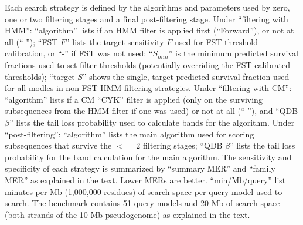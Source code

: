 \documentclass{bioinfo}
\begin{document}
\begin{table}[!t]
{}
{Each search strategy is defined by the algorithms and parameters used
by zero, one or two filtering stages and a final post-filtering
stage. Under ``filtering with HMM'': ``algorithm'' lists if an HMM
filter is applied first (``Forward''), or not at all (``-''); ``FST
$F$'' lists the target sensitivity $F$ used for FST threshold
calibration, or ``-'' if FST was not used; ``$S_{min}$'' 
is the minimum predicted survival fractions used to set filter
thresholds (potentially overriding the FST calibrated thresholds);
``target $S$'' shows the single, target predicted survival fraction
used for all modles in non-FST HMM filtering strategies.
Under ``filtering with CM'': ``algorithm'' lists if a CM ``CYK''
filter is applied (only on the surviving subsequences from the HMM
filter if one was used) or not at all (``-''), and ``QDB $\beta$''
lists the tail loss probability used to calculate bands for the
algorithm.  Under ``post-filtering'': ``algorithm'' lists the main
algorithm used for scoring subsequences that survive the $<=2$
filtering stages; ``QDB $\beta$'' lists the tail loss probability for
the band calculation for the main algorithm.
The sensitivity and specificity of each strategy is summarized by
``summary MER'' and ``family MER'' as explained in the text. Lower
MERs are better.  ``min/Mb/query'' list minutes per Mb (1,000,000
residues) of search space per query model used to search. The
benchmark contains 51 query models and 20 Mb of search space (both
strands of the 10 Mb pseudogenome) as explained in the text.}
\end{table}

\end{document}

